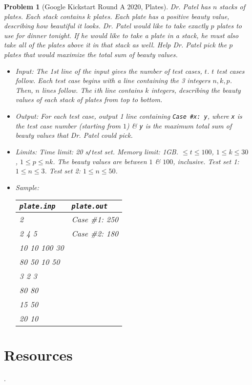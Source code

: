 \documentclass{article}
\newtheorem{problem}{Problem}
\begin{document}
\begin{problem}[Google Kickstart Round A 2020, Plates]
	Dr. Patel has $n$ stacks of plates. Each stack contains $k$ plates. Each plate has a positive beauty value, describing how beautiful it looks. Dr. Patel would like to take exactly $p$ plates to use for dinner tonight. If he would like to take a plate in a stack, he must also take all of the plates above it in that stack as well. Help Dr. Patel pick the $p$ plates that would maximize the total sum of beauty values.
	\begin{itemize}
		\item {\sf Input:} The 1st line of the input gives the number of test cases, $t$. $t$ test cases follow. Each test case begins with a line containing the 3 integers $n,k,p$. Then, $n$ lines follow. The $i$th line contains $k$ integers, describing the beauty values of each stack of plates from top to bottom.
		\item {\sf Output:} For each test case, output 1 line containing \verb|Case #x: y|, where \texttt{x} is the test case number (starting from $1$) \& \texttt{y} is the maximum total sum of beauty values that Dr. Patel could pick.
		\item {\sf Limits:} Time limit: \emph{20 s\texttt{/}test set}. Memory limit: \emph{1GB}. $\le t\le100$, $1\le k\le30$, $1\le p\le nk$. The beauty values are between $1$ \& $100$, inclusive. Test set 1: $1\le n\le 3$. Test set 2: $1\le n\le50$.
		\item {\sf Sample:}
		\begin{table}[H]
			\centering
			\begin{tabular}{|l|l|}
				\hline
				\texttt{plate.inp} & \texttt{plate.out} \\
				\hline
				2 & Case \#1: 250 \\
				2 4 5 & Case \#2: 180 \\
				10 10 100 30 & \\
				80 50 10 50 & \\
				3 2 3 & \\
				80 80 & \\
				15 50 & \\
				20 10 & \\
				\hline
			\end{tabular}
		\end{table}
	\end{itemize}
\end{problem}


\section*{Resources}
\cite{TLGK_chuyen_Tin_quyen_1, TLGK_chuyen_Tin_quyen_2, TLGK_chuyen_Tin_quyen_3, Knuth1997, VietSTEM2021, VietSTEM2022}.


\printbibliography[heading=bibintoc]
	
\end{document}
